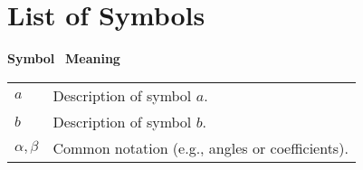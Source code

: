 \cleardoublepage
\chapter*{List of Symbols}
\begin{center}
  \textbf{Symbol} \quad\quad\quad\ \textbf{Meaning}\\[0.2cm]
  \begin{tabular}{ll}
    $a$ & Description of symbol $a$.\\
    $b$ & Description of symbol $b$.\\
    $\alpha,\beta$ & Common notation (e.g., angles or coefficients).\\
  \end{tabular}
\end{center}